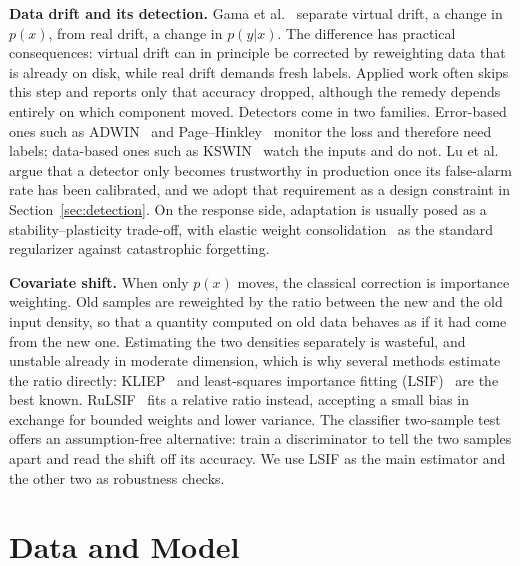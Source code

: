\documentclass[conference]{IEEEtran}
\begin{document}
\textbf{Data drift and its detection.}
Gama et al.~\cite{gama2014} separate virtual drift, a change in $p(x)$, from
real drift, a change in $p(y|x)$. The difference has practical consequences:
virtual drift can in principle be corrected by reweighting data that is already
on disk, while real drift demands fresh labels. Applied work often skips this
step and reports only that accuracy dropped, although the remedy depends
entirely on which component moved. Detectors come in two families.
Error-based ones such as ADWIN~\cite{adwin} and Page--Hinkley~\cite{page_hinkley}
monitor the loss and therefore need labels; data-based ones such as
KSWIN~\cite{kswin} watch the inputs and do not. Lu et al.~\cite{lu2019} argue
that a detector only becomes trustworthy in production once its false-alarm rate
has been calibrated, and we adopt that requirement as a design constraint in
Section~\ref{sec:detection}. On the response side, adaptation is usually posed
as a stability--plasticity trade-off, with elastic weight
consolidation~\cite{kirkpatrick2017} as the standard regularizer against
catastrophic forgetting.

\textbf{Covariate shift.}
When only $p(x)$ moves, the classical correction is importance weighting. Old
samples are reweighted by the ratio between the new and the old input density,
so that a quantity computed on old data behaves as if it had come from the new
one. Estimating the two densities separately is wasteful, and unstable already
in moderate dimension, which is why several methods estimate the ratio directly:
KLIEP~\cite{kliep} and least-squares importance fitting
(LSIF)~\cite{kanamori2009,sugiyama_book} are the best known.
RuLSIF~\cite{yamada2013} fits a relative ratio instead, accepting a small bias
in exchange for bounded weights and lower variance. The classifier two-sample
test~\cite{lopezpaz2017} offers an assumption-free alternative: train a
discriminator to tell the two samples apart and read the shift off its accuracy.
We use LSIF as the main estimator and the other two as robustness checks.

\section{Data and Model}
\label{sec:method}
\end{document}
